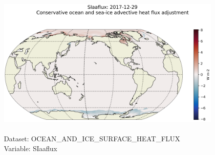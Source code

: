 \begin{figure}[H]
\centering
\includegraphics[scale=0.5]{../images/plots/latlon_plots/Ocean_and_Sea-Ice_Surface_Heat_Fluxes/SIaaflux.png}
\caption{\\Dataset: OCEAN\_AND\_ICE\_SURFACE\_HEAT\_FLUX\\Variable: SIaaflux}
\label{tab:table-OCEAN_AND_ICE_SURFACE_HEAT_FLUX_SIaaflux-Plot}
\end{figure}
\pagebreak
